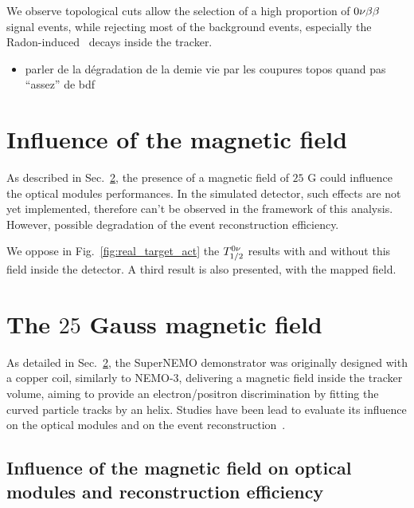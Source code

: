 We observe topological cuts allow the selection of a high proportion of $0\nu\beta\beta$ signal events, while rejecting most of the background events, especially the Radon-induced \Bi\ decays inside the tracker.


\begin{itemize}
\item parler de la dégradation de la demie vie par les coupures topos quand pas ``assez'' de bdf
\end{itemize}



\section{Influence of the magnetic field}

As described in Sec.~\ref{sec:magnetic_field}, the presence of a magnetic field of $25$ G could influence the optical modules performances.
In the simulated detector, such effects are not yet implemented, therefore can't be observed in the framework of this analysis.
However, possible degradation of the event reconstruction efficiency.


We oppose in Fig.~\ref{fig:real_target_act} the $T_{1/2}^{0\nu}$ results with and without this field inside the detector.
A third result is also presented, with the mapped field.


\section{The $25$ Gauss magnetic field}
\label{sec:magnetic_field}

As detailed in Sec.~\ref{sec:magnetic_field}, the SuperNEMO demonstrator was originally designed with a copper coil, similarly to NEMO-$3$, delivering a magnetic field inside the tracker volume, aiming to provide an electron/positron discrimination by fitting the curved particle tracks by an helix.
Studies have been lead to evaluate its influence on the optical modules and on the event reconstruction~\cite{CalvezThesis}\cite{internal:magnetic_field}.


\subsection{Influence of the magnetic field on optical modules and reconstruction efficiency}

